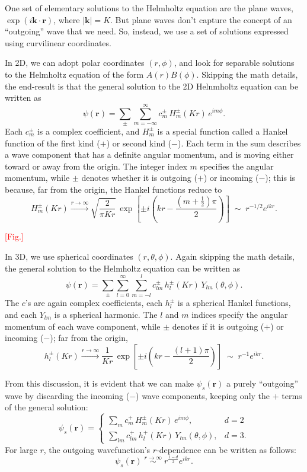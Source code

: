 \documentclass[pra,11pt]{revtex4}
\begin{document}
One set of elementary solutions to the Helmholtz equation are the
plane waves, $\exp(i\mathbf{k}\cdot\mathbf{r})$, where $|\mathbf{k}| =
K$.  But plane waves don't capture the concept of an ``outgoing'' wave
that we need.  So, instead, we use a set of solutions expressed using
curvilinear coordinates.

In 2D, we can adopt polar coordinates $(r,\phi)$, and look for
separable solutions to the Helmholtz equation of the form
$A(r)B(\phi)$.  Skipping the math details, the end-result is that the
general solution to the 2D Helnmholtz equation can be written as
$$\psi(\mathbf{r})=\sum_{\pm}\sum_{m=-\infty}^\infty c_m^\pm\,H_m^\pm(Kr)\,e^{im\phi}.$$
Each $c_m^\pm$ is a complex coefficient, and $H_m^\pm$ is a special
function called a Hankel function of the first kind ($+$) or second
kind ($-$).  Each term in the sum describes a wave component that has a
definite angular momentum, and is moving either toward or away from the
origin.  The integer index $m$ specifies the angular momentum, while
$\pm$ denotes whether it is outgoing ($+$) or incoming ($-$); this is
because, far from the origin, the Hankel functions reduce to
$$H_m^\pm(Kr) \overset{r\rightarrow\infty}{\longrightarrow} \sqrt{\frac{2}{\pi Kr}} \, \exp\left[\pm i\left(kr - \frac{(m+\frac{1}{2})\pi}{2}\right)\right] \;\sim\; r^{-1/2} e^{ikr}.$$

\textcolor{red}{[Fig.]}

In 3D, we use spherical coordinates $(r,\theta,\phi)$.  Again skipping
the math details, the general solution to the Helmholtz equation can
be written as
$$\psi(\mathbf{r})=\sum_{\pm}\sum_{l=0}^\infty\sum_{m=-l}^lc_{lm}^\pm\,h_l^\pm(Kr)\,Y_{lm}(\theta,\phi).$$
The $c$'s are again complex coefficients, each $h_l^\pm$ is a
spherical Hankel functions, and each $Y_{lm}$ is a spherical harmonic.
The $l$ and $m$ indices specify the angular momentum of each wave
component, while $\pm$ denotes if it is outgoing ($+$) or incoming
($-$); far from the origin,
$$h_l^\pm(Kr) \overset{r\rightarrow\infty}{\longrightarrow} \frac{1}{Kr}\,\exp\left[\pm i\left(kr-\frac{(l+1)\pi}{2}\right)\right] \;\sim\; r^{-1} e^{ikr}.$$

From this discussion, it is evident that we can make
$\psi_s(\mathbf{r})$ a purely ``outgoing'' wave by discarding the
incoming ($-$) wave components, keeping only the $+$ terms of the
general solution:
$$\psi_s(\mathbf{r}) = \begin{cases} \displaystyle\sum_{m} c_m^+\,H_m^\pm(Kr)\,e^{im\phi}, &d=2\\ \displaystyle\sum_{lm} c_{lm}^+\,h_l^+(Kr)\,Y_{lm}(\theta,\phi),&d=3.\end{cases}$$
For large $r$, the outgoing wavefunction's $r$-dependence can be
written as follows:
$$\psi_s(\mathbf{r}) \; \overset{r\rightarrow\infty}{\sim} \; r^{\frac{1-d}{2}} e^{ikr}.$$
\end{document}
